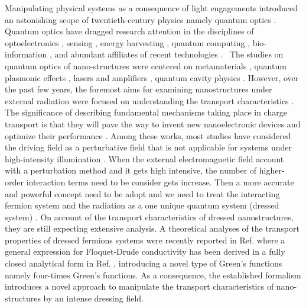 
Manipulating physical systems as a consequence of light engagements introduced an astonishing scope of twentieth-century physics namely quantum optics \cite{grynberg10}.
Quantum optics have dragged research attention in the disciplines of optoelectronics \cite{liu16,wijesekara20,tao21}, sensing \cite{rodrigo2015,pirandola18,hapuarachchi2018}, energy harvesting \cite{yuan16,sun18},
quantum computing \cite{huh15,slussarenko19,andersen21}, bio-information \cite{marais18,bian20}, and abundant affiliates of recent technologies \cite{rivera20}. 
The studies on quantum optics of nano-structures were centered on metamaterials \cite{shalaev07,si14}, quantum plasmonic effects \cite{hapuarachchi19,perera20}, lasers and amplifiers \cite{zhang05,chow13}, quantum cavity physics \cite{tsang10,devi20}.
However, over the past few years, the foremost aims for examining nanostructures under external radiation were focused on understanding the transport characteristics \cite{kitagawa11,zhou11,kibis14,pervishko15,morina15,dehghani15,dini16,wackerl20}. 
The significance of describing fundamental mechanisms taking place in charge transport is that they will pave the way to invent new nanoelectronic devices and optimize their performance \cite{premaratne21}.
Among these works, most studies have considered the driving field as a perturbative field \cite{pervishko15,morina15} that is not applicable for systems under high-intensity illumination \cite{grifoni98,wackerl20}. When the external electromagnetic field account with a perturbation method and it gets high intensive, the number of higher-order interaction terms need to be consider gets increase. Then a more accurate and powerful concept need to be adopt and we need to treat the interacting fermion system and the radiation as a one unique quantum system (dressed system) \cite{morina15,cohen98,scully01}. On account of the transport characteristics of dressed nanostructures, they are still expecting extensive analysis.
A theoretical analyses of the transport properties of dressed fermions systems were recently reported in Ref. \cite{kibis14,morina15,wackerl20} where a general expression for Floquet-Drude conductivity has been derived in a fully closed analytical form in Ref. \cite{wackerl20}, introducing a novel type of Green’s functions namely four-times Green’s functions. As a consequence, the established formalism introduces a novel approach to manipulate the transport characteristics of nano-structures by an intense dressing field.

